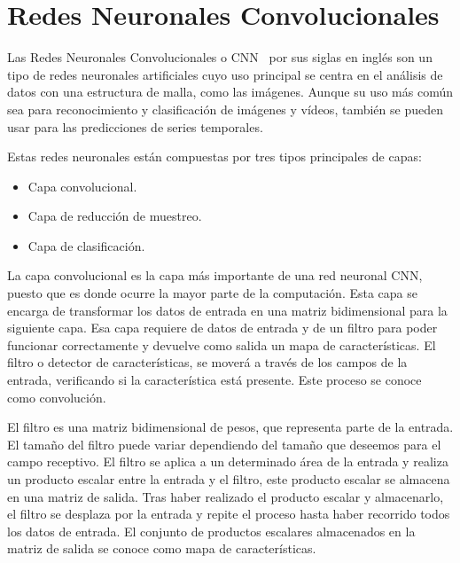 \section{Redes Neuronales Convolucionales}

Las Redes Neuronales Convolucionales o CNN~\cite{cnn} por sus siglas en inglés son un tipo de redes neuronales artificiales cuyo uso principal se centra en el análisis de datos con una estructura de malla, como las imágenes. Aunque su uso más común sea para reconocimiento y clasificación de imágenes y vídeos, también se pueden usar para las predicciones de series temporales.

\par

Estas redes neuronales están compuestas por tres tipos principales de capas:
\begin{itemize}
    \item Capa convolucional. 
    \item Capa de reducción de muestreo.
    \item Capa de clasificación.
\end{itemize}

La capa convolucional es la capa más importante de una red neuronal CNN, puesto que es donde ocurre la mayor parte de la computación. Esta capa se encarga de transformar los datos de entrada en una matriz bidimensional para la siguiente capa. Esa capa requiere de datos de entrada y de un filtro para poder funcionar correctamente y devuelve como salida un mapa de características. El filtro o detector de características, se moverá a través de los campos de la entrada, verificando si la característica está presente. Este proceso se conoce como convolución.

\par

El filtro es una matriz bidimensional de pesos, que representa parte de la entrada. El tamaño del filtro puede variar dependiendo del tamaño que deseemos para el campo receptivo. El filtro se aplica a un determinado área de la entrada y realiza un producto escalar entre la entrada y el filtro, este producto escalar se almacena en una matriz de salida. Tras haber realizado el producto escalar y almacenarlo, el filtro se desplaza por la entrada y repite el proceso hasta haber recorrido todos los datos de entrada. El conjunto de productos escalares almacenados en la matriz de salida se conoce como mapa de características.

\par

